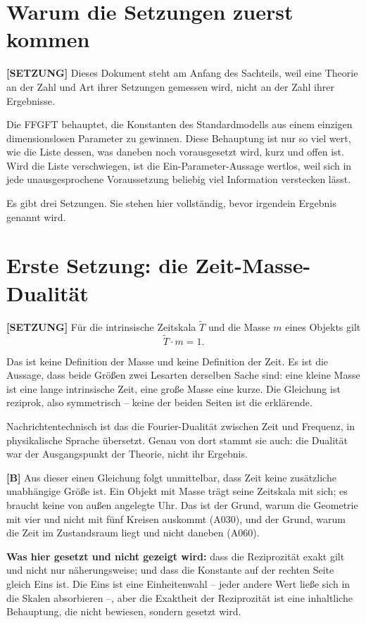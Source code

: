 \section{Warum die Setzungen zuerst kommen}

\textbf{[SETZUNG]} Dieses Dokument steht am Anfang des Sachteils, weil eine
Theorie an der Zahl und Art ihrer Setzungen gemessen wird, nicht an der Zahl
ihrer Ergebnisse.

Die FFGFT behauptet, die Konstanten des Standardmodells aus einem einzigen
dimensionslosen Parameter zu gewinnen. Diese Behauptung ist nur so viel wert,
wie die Liste dessen, was daneben noch vorausgesetzt wird, kurz und offen ist.
Wird die Liste verschwiegen, ist die Ein-Parameter-Aussage wertlos, weil sich
in jede unausgesprochene Voraussetzung beliebig viel Information verstecken
lässt.

Es gibt drei Setzungen. Sie stehen hier vollständig, bevor irgendein Ergebnis
genannt wird.

\section{Erste Setzung: die Zeit-Masse-Dualität}

\textbf{[SETZUNG]} Für die intrinsische Zeitskala $\tilde T$ und die Masse $m$
eines Objekts gilt
\[
  \tilde T \cdot m = 1 .
\]

Das ist keine Definition der Masse und keine Definition der Zeit. Es ist die
Aussage, dass beide Größen zwei Lesarten derselben Sache sind: eine kleine
Masse ist eine lange intrinsische Zeit, eine große Masse eine kurze. Die
Gleichung ist reziprok, also symmetrisch -- keine der beiden Seiten ist die
erklärende.

Nachrichtentechnisch ist das die Fourier-Dualität zwischen Zeit und Frequenz,
in physikalische Sprache übersetzt. Genau von dort stammt sie auch:
die Dualität war der Ausgangspunkt der Theorie, nicht ihr Ergebnis.

\textbf{[B]} Aus dieser einen Gleichung folgt unmittelbar, dass Zeit keine
zusätzliche unabhängige Größe ist. Ein Objekt mit Masse trägt seine Zeitskala
mit sich; es braucht keine von außen angelegte Uhr. Das ist der Grund, warum
die Geometrie mit vier und nicht mit fünf Kreisen auskommt (A030), und der
Grund, warum die Zeit im Zustandsraum liegt und nicht daneben (A060).

\textbf{Was hier gesetzt und nicht gezeigt wird:} dass die Reziprozität exakt
gilt und nicht nur näherungsweise; und dass die Konstante auf der rechten Seite
gleich Eins ist. Die Eins ist eine Einheitenwahl -- jeder andere Wert ließe sich
in die Skalen absorbieren --, aber die Exaktheit der Reziprozität ist eine
inhaltliche Behauptung, die nicht bewiesen, sondern gesetzt wird.


